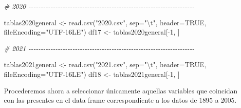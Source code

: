 \documentclass[
]{article}
\newenvironment{Shaded}{\begin{snugshade}}{\end{snugshade}}
\newcommand{\AttributeTok}[1]{\textcolor[rgb]{0.77,0.63,0.00}{#1}}
\newcommand{\CommentTok}[1]{\textcolor[rgb]{0.56,0.35,0.01}{\textit{#1}}}
\newcommand{\ConstantTok}[1]{\textcolor[rgb]{0.00,0.00,0.00}{#1}}
\newcommand{\DecValTok}[1]{\textcolor[rgb]{0.00,0.00,0.81}{#1}}
\newcommand{\FunctionTok}[1]{\textcolor[rgb]{0.00,0.00,0.00}{#1}}
\newcommand{\NormalTok}[1]{#1}
\newcommand{\OtherTok}[1]{\textcolor[rgb]{0.56,0.35,0.01}{#1}}
\newcommand{\SpecialCharTok}[1]{\textcolor[rgb]{0.00,0.00,0.00}{#1}}
\newcommand{\StringTok}[1]{\textcolor[rgb]{0.31,0.60,0.02}{#1}}
\begin{document}
\begin{Shaded}
\begin{Highlighting}[]
\CommentTok{\# 2020 {-}{-}{-}{-}{-}{-}{-}{-}{-}{-}{-}{-}{-}{-}{-}{-}{-}{-}{-}{-}{-}{-}{-}{-}{-}{-}{-}{-}{-}{-}{-}{-}{-}{-}{-}{-}{-}{-}{-}{-}{-}{-}{-}{-}{-}{-}{-}{-}{-}{-}{-}{-}{-}{-}{-}{-}{-}{-}{-}{-}{-}{-}{-}{-}{-}{-}{-}{-}}

\NormalTok{tablas2020general }\OtherTok{\textless{}{-}} \FunctionTok{read.csv}\NormalTok{(}\StringTok{"2020.csv"}\NormalTok{, }\AttributeTok{sep=}\StringTok{"}\SpecialCharTok{\textbackslash{}t}\StringTok{"}\NormalTok{, }\AttributeTok{header=}\ConstantTok{TRUE}\NormalTok{, }\AttributeTok{fileEncoding=}\StringTok{"UTF{-}16LE"}\NormalTok{)}
\NormalTok{df17 }\OtherTok{\textless{}{-}}\NormalTok{ tablas2020general[}\SpecialCharTok{{-}}\DecValTok{1}\NormalTok{, ]}


\CommentTok{\# 2021 {-}{-}{-}{-}{-}{-}{-}{-}{-}{-}{-}{-}{-}{-}{-}{-}{-}{-}{-}{-}{-}{-}{-}{-}{-}{-}{-}{-}{-}{-}{-}{-}{-}{-}{-}{-}{-}{-}{-}{-}{-}{-}{-}{-}{-}{-}{-}{-}{-}{-}{-}{-}{-}{-}{-}{-}{-}{-}{-}{-}{-}{-}{-}{-}{-}{-}{-}{-}}

\NormalTok{tablas2021general }\OtherTok{\textless{}{-}} \FunctionTok{read.csv}\NormalTok{(}\StringTok{"2021.csv"}\NormalTok{, }\AttributeTok{sep=}\StringTok{"}\SpecialCharTok{\textbackslash{}t}\StringTok{"}\NormalTok{, }\AttributeTok{header=}\ConstantTok{TRUE}\NormalTok{, }\AttributeTok{fileEncoding=}\StringTok{"UTF{-}16LE"}\NormalTok{)}
\NormalTok{df18 }\OtherTok{\textless{}{-}}\NormalTok{ tablas2021general[}\SpecialCharTok{{-}}\DecValTok{1}\NormalTok{, ]}
\end{Highlighting}
\end{Shaded}

Procederemos ahora a seleccionar únicamente aquellas variables que
coincidan con las presentes en el data frame correspondiente a los datos
de 1895 a 2005.
\end{document}
